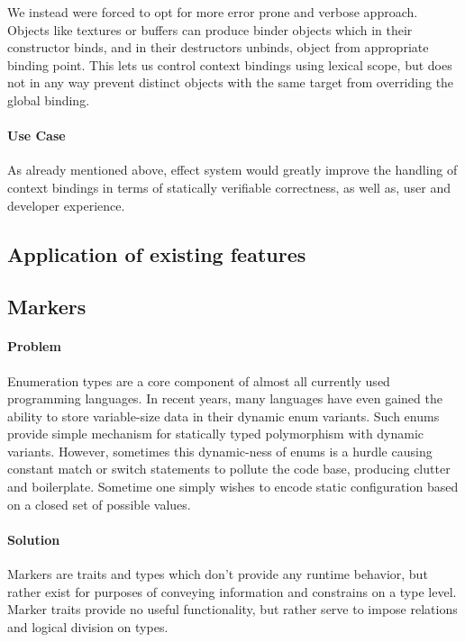 We instead were forced to opt for more error prone and verbose approach. 
Objects like textures or buffers can produce binder objects which in their constructor binds, and in their destructors unbinds, object from appropriate binding point.
This lets us control context bindings using lexical scope, but does not in any way prevent distinct objects with the same target from overriding the global binding.

\paragraph{Use Case}

As already mentioned above, effect system would greatly improve the handling of context bindings in terms of statically verifiable correctness, as well as, user and developer experience.

\subsection{Application of existing features}

\subsection{Markers}

\paragraph{Problem}

Enumeration types are a core component of almost all currently used programming languages. In recent years, many languages have even gained the ability to store variable-size data in their dynamic enum variants.
Such enums provide simple mechanism for statically typed polymorphism with dynamic variants. 
However, sometimes this dynamic-ness of enums is a hurdle causing constant match or switch statements to pollute the code base, producing clutter and boilerplate.
Sometime one simply wishes to encode static configuration based on a closed set of possible values.

\paragraph{Solution}

Markers are traits and types which don't provide any runtime behavior, but rather exist for purposes of conveying information and constrains on a type level.
Marker traits provide no useful functionality, but rather serve to impose relations and logical division on types.

